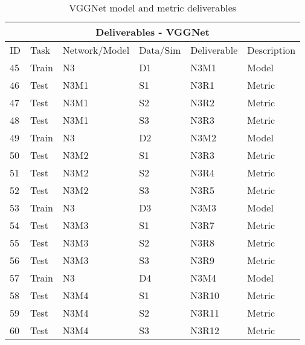 \begin{table}[]
\begin{center}
\begin{tabular}{|l|l|l|l|l|l|}
\hline
\multicolumn{6}{|c|}{Deliverables - VGGNet} \\ \hline

ID & Task &  Network/Model & Data/Sim & Deliverable & Description \\ \hline\hline
45 & Train & N3 & D1 & N3M1 & Model \\ \hline
46 & Test & N3M1 & S1 & N3R1 & Metric \\ \hline
47 & Test & N3M1 & S2 & N3R2 & Metric \\ \hline
48 & Test & N3M1 & S3 & N3R3 & Metric \\ \hline\hline

49 & Train & N3 & D2 & N3M2 & Model \\ \hline
50 & Test & N3M2 & S1 & N3R3 & Metric \\ \hline
51 & Test & N3M2 & S2 & N3R4 & Metric \\ \hline
52 & Test & N3M2 & S3 & N3R5 & Metric \\ \hline\hline

53 & Train & N3 & D3 & N3M3 & Model \\ \hline
54 & Test & N3M3 & S1 & N3R7 & Metric \\ \hline
55 & Test & N3M3 & S2 & N3R8 & Metric \\ \hline
56 & Test & N3M3 & S3 & N3R9 & Metric \\ \hline\hline

57 & Train & N3 & D4 & N3M4 & Model \\ \hline
58 & Test & N3M4 & S1 & N3R10 & Metric \\ \hline
59 & Test & N3M4 & S2 & N3R11 & Metric \\ \hline
60 & Test & N3M4 & S3 & N3R12 & Metric \\ \hline 

\end{tabular}
\end{center}
\caption{VGGNet model and metric deliverables}
\label{Deliverables-VGGNet}
\end{table}



